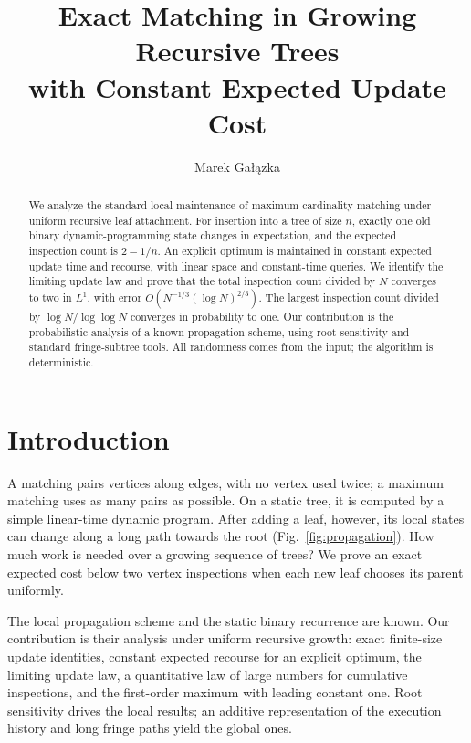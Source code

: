 \documentclass[runningheads,envcountsame,orivec]{llncs}
\begin{document}
\title{Exact Matching in Growing Recursive Trees\texorpdfstring{\\}{ }with Constant Expected Update Cost}
\author{Marek Ga\l{}\k{a}zka}
\maketitle

\begin{abstract}
We analyze the standard local maintenance of maximum-cardinality
matching under uniform recursive leaf attachment. For insertion into a
tree of size $n$, exactly one old binary dynamic-programming state
changes in expectation, and the expected inspection count is $2-1/n$.
An explicit optimum is maintained in constant expected update time and
recourse, with linear space and constant-time queries. We identify the
limiting update law and prove that the total inspection count divided
by $N$ converges to two in $L^1$, with error
$O(N^{-1/3}(\log N)^{2/3})$. The largest inspection count divided by
$\log N/\log\log N$ converges in probability to one. Our contribution
is the probabilistic analysis of a known propagation scheme, using
root sensitivity and standard fringe-subtree tools. All randomness
comes from the input; the algorithm is deterministic.
\end{abstract}

\section{Introduction}

A matching pairs vertices along edges, with no vertex used twice;
a maximum matching uses as many pairs as possible. On a static tree,
it is computed by a simple linear-time dynamic program. After adding
a leaf, however, its local states can change along a long path towards
the root (Fig.~\ref{fig:propagation}). How much work is needed over a
growing sequence of trees? We prove an exact expected cost below two
vertex inspections when each new leaf chooses its parent uniformly.

The local propagation scheme and the static binary recurrence are
known. Our contribution is their analysis under uniform recursive
growth: exact finite-size update identities, constant expected
recourse for an explicit optimum, the limiting update law, a
quantitative law of large numbers for cumulative inspections, and the
first-order maximum with leading constant one. Root sensitivity
drives the local results; an additive representation of the execution
history and long fringe paths yield the global ones.
\end{document}
